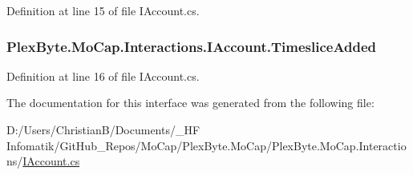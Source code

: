 Definition at line 15 of file I\+Account.\+cs.

\subsubsection[{\texorpdfstring{Timeslice\+Added}{TimesliceAdded}}]{ Plex\+Byte.\+Mo\+Cap.\+Interactions.\+I\+Account.\+Timeslice\+Added}\hypertarget{interface_plex_byte_1_1_mo_cap_1_1_interactions_1_1_i_account_a7866018e22c1935e5042e418360f855f}{}\label{interface_plex_byte_1_1_mo_cap_1_1_interactions_1_1_i_account_a7866018e22c1935e5042e418360f855f}


Definition at line 16 of file I\+Account.\+cs.



The documentation for this interface was generated from the following file\+:\begin{DoxyCompactItemize}
\item 
D\+:/\+Users/\+Christian\+B/\+Documents/\+\_\+\+H\+F Infomatik/\+Git\+Hub\+\_\+\+Repos/\+Mo\+Cap/\+Plex\+Byte.\+Mo\+Cap/\+Plex\+Byte.\+Mo\+Cap.\+Interactions/\hyperlink{_i_account_8cs}{I\+Account.\+cs}\end{DoxyCompactItemize}
